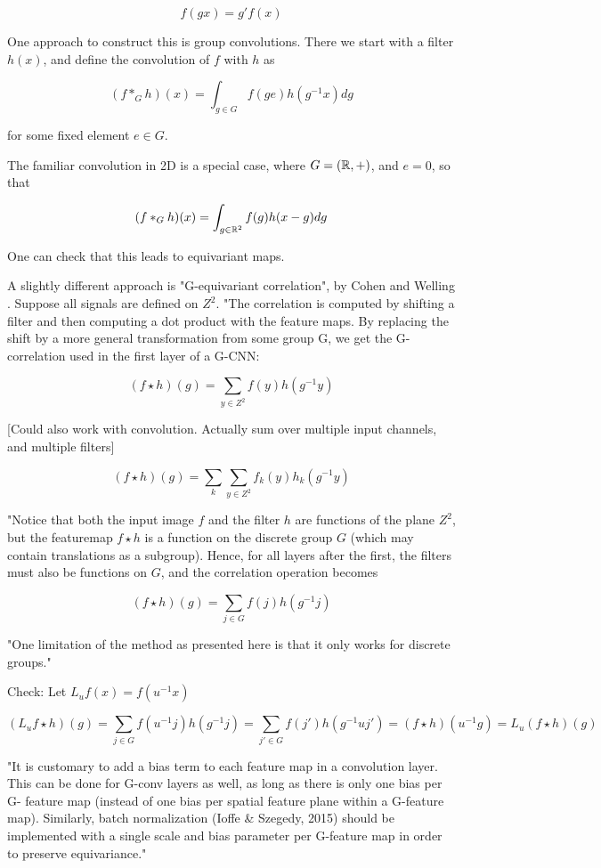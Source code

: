 \documentclass[english]{article}
\begin{document}
$$f(gx) = g'f(x)$$

\item One approach to construct this is group convolutions. There we start with a filter $h(x)$, and  define the convolution of $f$ with $h$ as

$$(f *_G h)(x) = \int_{g\in G} f(ge)h(g^{-1}x)dg$$

for some fixed element $e\in G$. 

The familiar convolution in 2D is a special case, where $G = (\mathbb{R},+)$, and $e = 0$, so that 

$$(f *_G h)(x) = \int_{g\in \mathbb{R}^2} f(g)h(x-g)dg$$

One can check that this leads to equivariant maps.

\item 
A slightly different approach is "G-equivariant correlation", by Cohen and Welling . Suppose all signals are defined on $Z^2$. "The correlation is computed by shifting a filter and then computing a dot product with the feature maps. By
replacing the shift by a more general transformation from
some group G, we get the G-correlation used in the first
layer of a G-CNN: 

$$(f \star h)(g) = \sum_{y\in Z^2} f(y)h(g^{-1}y)$$

[Could also work with convolution. Actually sum over multiple input channels, and multiple filters]

$$(f \star h)(g) = \sum_k\sum_{y\in Z^2} f_k(y)h_k(g^{-1}y)$$

"Notice that both the input image $f$ and the filter $h$ are functions of the plane $Z^2$, but the featuremap $f \star h$ is a function
on the discrete group $G$ (which may contain translations as
a subgroup). Hence, for all layers after the first, the filters
must also be functions on $G$, and the correlation operation
becomes

$$(f \star h)(g) = \sum_{j\in G} f(j)h(g^{-1}j)$$

"One limitation of the method as presented here is that
it only works for discrete groups."

Check: Let $L_uf(x) = f(u^{-1}x)$

$$
(L_u f \star h)(g) 
= \sum_{j\in G} f(u^{-1}j)h(g^{-1}j)
= \sum_{j'\in G} f(j')h(g^{-1}uj')
= (f \star h)(u^{-1}g) 
= L_u (f \star h)(g) 
$$

"It is customary to add a bias term to each feature map
in a convolution layer. This can be done for G-conv
layers as well, as long as there is only one bias per G-
feature map (instead of one bias per spatial feature plane
within a G-feature map). Similarly, batch normalization
(Ioffe \& Szegedy, 2015) should be implemented with a single scale and bias parameter per G-feature map in order
to preserve equivariance."
\end{document}
